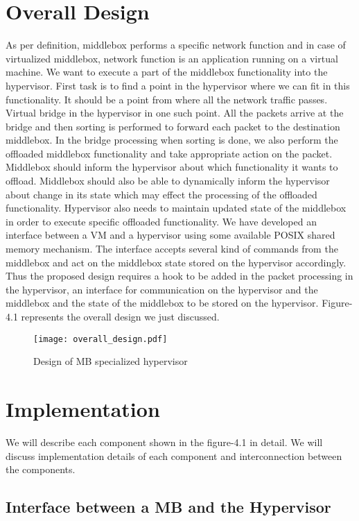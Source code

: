 \documentclass[a4paper,11pt]{report}
\begin{document}
\section{Overall Design}
As per definition, middlebox performs a specific network function and in case of virtualized middlebox, network function is an application running on a virtual machine. We want to execute a part of the middlebox functionality into the hypervisor. First task is to find a point in the hypervisor where we can fit in this functionality. It should be a point from where all the network traffic passes. Virtual bridge in the hypervisor in one such point. All the packets arrive at the bridge and then sorting is performed to forward each packet to the destination middlebox. In the bridge processing when sorting is done, we also perform the offloaded middlebox functionality and take appropriate action on the packet. Middlebox should inform the hypervisor about which functionality it wants to offload. Middlebox should also be able to dynamically inform the hypervisor about change in its state which may effect the processing of the offloaded functionality. Hypervisor also needs to maintain updated state of the middlebox in order to execute specific offloaded functionality. We have developed an interface between a VM and a hypervisor using some available POSIX shared memory mechanism. The interface accepts several kind of commands from the middlebox and act on the middlebox state stored on the hypervisor accordingly. Thus the proposed design requires a hook to be added in the packet processing in the hypervisor, an interface for communication on the hypervisor and the middlebox and the state of the middlebox to be stored on the hypervisor. Figure-4.1 represents the overall design we just discussed.
\begin{figure}[h]
\centering
\texttt{[image: overall\_design.pdf]}
\caption{Design of MB specialized hypervisor}
\end{figure}   
            
\section{Implementation}
We will describe each component shown in the figure-4.1 in detail. We will discuss implementation details of each component and interconnection between the components.
\subsection{Interface between a MB and the Hypervisor}
\end{document}

